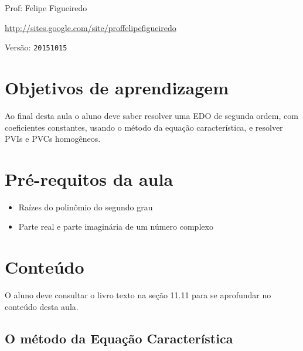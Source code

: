 \documentclass[a4paper]{article}
\begin{document}
\parbox[c]{.825\textwidth}{\raggedright%
{Prof: Felipe Figueiredo\par}
{\url{http://sites.google.com/site/proffelipefigueiredo}\par}
}

Versão: \verb|20151015|



\section{Objetivos de aprendizagem}

Ao final desta aula o aluno deve saber resolver uma EDO de segunda
ordem, com coeficientes constantes, usando o método da equação
característica, e resolver PVIs e PVCs homogêneos.


\section{Pré-requitos da aula}

\begin{itemize}
\item Raízes do polinômio do segundo grau
\item Parte real e parte imaginária de um número complexo
\end{itemize}

\section{Conteúdo}

O aluno deve consultar o livro texto na seção 11.11 para se aprofundar
no conteúdo desta aula.


\subsection{O método da Equação Característica}
\end{document}
